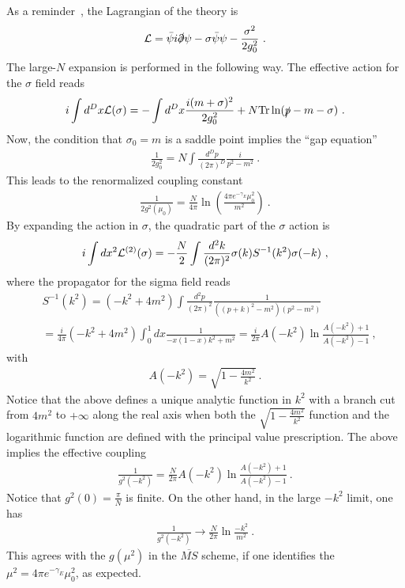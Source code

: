 \documentclass[a4paper,11pt]{article}
\begin{document}
As a reminder~\cite{Coleman:1985rnk}, the Lagrangian of the theory is 
\begin{align}
{\cal L}=\bar \psi i\slashed{\partial}\psi-\sigma \bar\psi \psi-\frac{\sigma^2}{2g_0^2} \ .
\end{align}
The large-$N$ expansion is performed in the following way. The effective action for the $\sigma$ field reads
\begin{align}
i\int d^Dx {\cal L}(\sigma)=-\int d^Dx \frac{i(m+\sigma)^2}{2g_0^2}+N{\rm Tr} \ln (\slashed{p}-m-\sigma) \ .
\end{align}
Now, the condition that $\sigma_0=m$ is a saddle point implies the ``gap equation''
\begin{align}
\frac{1}{2g_0^2}=N\int \frac{d^Dp}{(2\pi)^D}\frac{i}{p^2-m^2} \ .
\end{align}
This leads to the renormalized coupling constant
\begin{align}
\frac{1}{2g^2(\mu_0)}=\frac{N}{4\pi}\ln \left(\frac{4\pi e^{-\gamma_E}\mu_0^2}{m^2}\right) \ .
\end{align}
By expanding the action in $\sigma$, the quadratic part of the $\sigma$ action is
\begin{align}
i\int dx^2 {\cal L}^{(2)}(\sigma)=-\frac{N}{2}\int \frac{d^2k}{(2\pi)^2} \sigma(k)S^{-1}(k^2)\sigma(-k) \ ,
\end{align}
where the propagator for the sigma field reads
\begin{align}
&S^{-1}(k^2)=(-k^2+4m^2)\int \frac{d^2p}{(2\pi)^2}\frac{1}{((p+k)^2-m^2)(p^2-m^2)} \nonumber \\
&=\frac{i}{4\pi}(-k^2+4m^2)\int_{0}^1 dx \frac{1}{-x(1-x)k^2+m^2}=\frac{i}{2\pi}A(-k^2)\ln \frac{A(-k^2)+1}{A(-k^2)-1}   \ ,
\end{align}
with
\begin{align}
A(-k^2)=\sqrt{1-\frac{4m^2}{k^2}} \ .
\end{align}
Notice that the above defines a unique analytic function in $k^2$ with a branch cut from $4m^2$ to $+\infty$ along the real axis when both the $\sqrt{1-\frac{4m^2}{k^2}}$ function and the logarithmic function are defined with the principal value prescription.   The above implies the effective coupling
\begin{align}
\frac{1}{g^2(-k^2)}=\frac{N}{2\pi}A(-k^2)\ln \frac{A(-k^2)+1}{A(-k^2)-1} \ .
\end{align}
Notice that $g^2(0)=\frac{\pi}{N}$ is finite. On the other hand, in the large $-k^2$ limit, one has
\begin{align}
\frac{1}{g^2(-k^2)} \rightarrow \frac{N}{2\pi}\ln \frac{-k^2}{m^2} \ .
\end{align}
This agrees with the $g(\mu^2)$ in the $\overline{MS}$ scheme, if one identifies the $\mu^2=4\pi e^{-\gamma_E}\mu_0^2$, as expected. 
\end{document}
